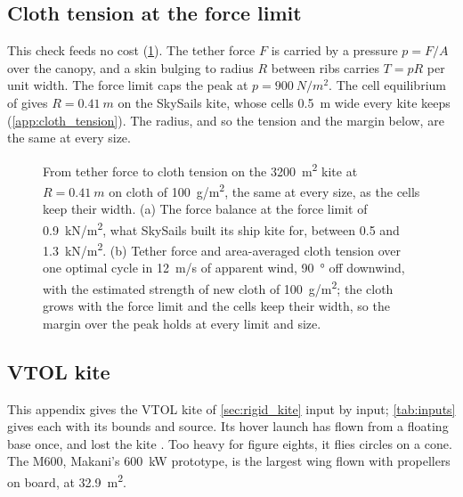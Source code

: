 \subsection{Cloth tension at the force limit}
\label{sec:cloth_check}

This check feeds no cost (\cref{fig:canopy_tension}). The tether force $F$ is carried by a pressure $p=F/A$ over the canopy, and a skin bulging to radius $R$ between ribs carries $T=pR$ per unit width. The force limit caps the peak at $p=\SI{900}{N/m^2}$. The cell equilibrium of \citet{wang2018} gives $R=\SI{0.41}{m}$ on the SkySails kite, whose cells \SI{0.5}{m} wide every kite keeps (\cref{app:cloth_tension}). The radius, and so the tension and the margin below, are the same at every size.


\begin{figure}[tbp]
\centering
{}
\caption{ From tether force to cloth tension on the \SI{3200}{m^2} kite at $R=\SI{0.41}{m}$ on cloth of \SI{100}{g/m^2}, the same at every size, as the cells keep their width. (a) The force balance at the force limit of \SI{0.9}{kN/m^2}, what SkySails built its ship kite for, between 0.5 and \SI{1.3}{kN/m^2}. (b) Tether force and area-averaged cloth tension over one optimal cycle in \SI{12}{m/s} of apparent wind, \SI{90}{\degree} off downwind, with the estimated strength of new cloth of \SI{100}{g/m^2}; the cloth grows with the force limit and the cells keep their width, so the margin over the peak holds at every limit and size.}
\label{fig:canopy_tension}
\end{figure}

\subsection{VTOL kite}
\label{sec:det_rigid}

This appendix gives the VTOL kite of \cref{sec:rigid_kite} input by input; \cref{tab:inputs} gives each with its bounds and source. Its hover launch has flown from a floating base once, and lost the kite \citep{echeverri2020part1}. Too heavy for figure eights, it flies circles on a cone. The M600, Makani's \SI{600}{kW} prototype, is the largest wing flown with propellers on board, at \SI{32.9}{m^2}.

